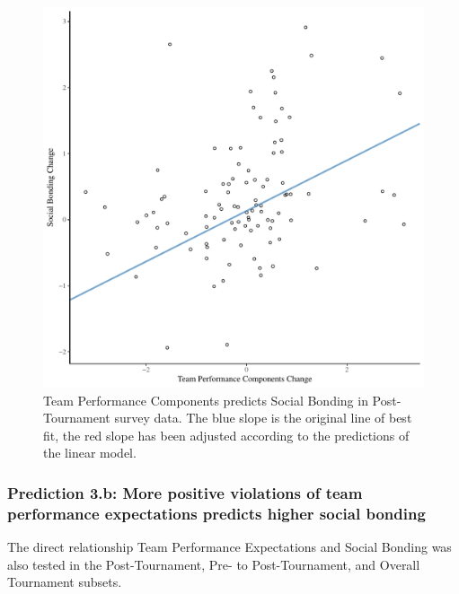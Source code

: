 \begin{CJK}{UTF8}{gbsn}
  

  \begin{figure}[htbp]
    \centering
  \includegraphics[scale=.5]{images/jasBondDeltaModelSlope.pdf}
    \caption{Team Performance Components predicts Social Bonding in Post-Tournament survey data. The blue slope is the original line of best fit, the red slope has been adjusted according to the predictions of the linear model.}
    \label{fig:jasBondDeltaModelSlope}
  \end{figure}









\subsubsection{Prediction 3.b: More positive violations of team performance expectations predicts higher social bonding}

The direct relationship Team Performance Expectations and Social Bonding was also tested in the Post-Tournament, Pre- to Post-Tournament, and Overall Tournament subsets.


\end{CJK}

